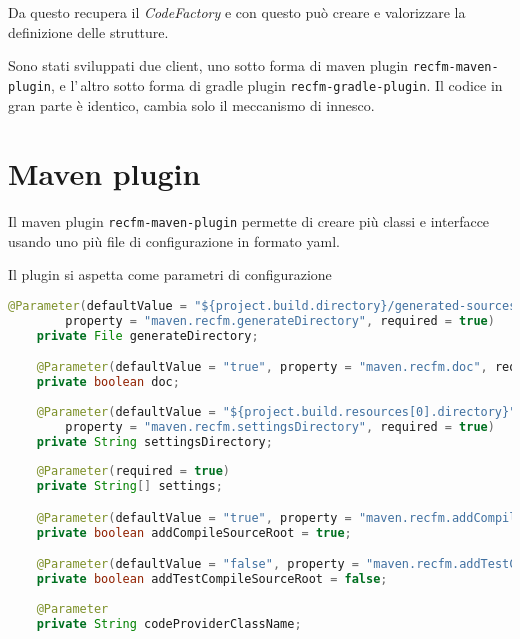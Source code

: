 \documentclass[a4paper,10pt]{report}
\begin{document}
Da questo recupera il \textsl{CodeFactory} e con questo può creare e valorizzare
la definizione delle strutture.

Sono stati sviluppati due client, uno sotto forma di maven plugin 
\verb!recfm-maven-plugin!, e l'\,altro sotto forma di gradle plugin 
\verb!recfm-gradle-plugin!. Il codice in gran parte è identico, cambia solo il 
meccanismo di innesco.

\section{Maven plugin}
Il maven plugin \verb!recfm-maven-plugin! permette di creare più classi e 
interfacce usando uno più file di configurazione in formato yaml.

Il plugin si aspetta come parametri di configurazione
\begin{lstlisting}[language=java, caption=parametri impostabili del maven plugin, 
label=code:spring-conf]
    @Parameter(defaultValue = "${project.build.directory}/generated-sources/recfm",
        property = "maven.recfm.generateDirectory", required = true)
    private File generateDirectory;

    @Parameter(defaultValue = "true", property = "maven.recfm.doc", required = true)
    private boolean doc;
    
    @Parameter(defaultValue = "${project.build.resources[0].directory}",
        property = "maven.recfm.settingsDirectory", required = true)
    private String settingsDirectory;
    
    @Parameter(required = true)
    private String[] settings;

    @Parameter(defaultValue = "true", property = "maven.recfm.addCompileSourceRoot")
    private boolean addCompileSourceRoot = true;

    @Parameter(defaultValue = "false", property = "maven.recfm.addTestCompileSourceRoot")
    private boolean addTestCompileSourceRoot = false;
    
    @Parameter
    private String codeProviderClassName;
\end{lstlisting}
\end{document}
